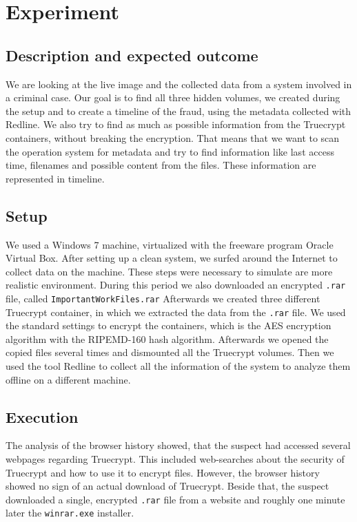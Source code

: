 \section{Experiment}
\subsection{Description and expected outcome}
We are looking at the live image and the collected data from a system involved in a criminal case. Our goal is to find all three hidden volumes, we created during the setup and to create a timeline of the fraud, using the metadata collected with Redline. 
We also try to find as much as possible information from the Truecrypt containers, without breaking the encryption. That means that we want to scan the operation system for metadata and try to find information like last access time, filenames and possible content from the files. These information are represented in timeline.

\subsection{Setup}
We used a Windows 7 machine, virtualized with the freeware program Oracle Virtual Box. After setting up a clean system, we surfed around the Internet to collect data on the machine. 
These steps were necessary to simulate are more realistic environment.
During this period we also downloaded an encrypted \verb+.rar+ file, called \verb+ImportantWorkFiles.rar+ Afterwards we created three different Truecrypt container, in which we extracted the data from the \verb+.rar+ file.
We used the standard settings to encrypt the containers, which is the AES encryption algorithm with the RIPEMD-160 hash algorithm.
Afterwards we opened the copied files several times and dismounted all the Truecrypt volumes.
Then we used the tool Redline to collect all the information of the system to analyze them offline on a different machine.

\subsection{Execution}
The analysis of the browser history showed, that the suspect had accessed several webpages regarding Truecrypt. This included web-searches about the security of Truecrypt and how to use it to encrypt files. However, the browser history showed no sign of an actual download of Truecrypt. Beside that, the suspect downloaded a single, encrypted \verb+.rar+ file from a website and roughly one minute later the \verb+winrar.exe+ installer.

